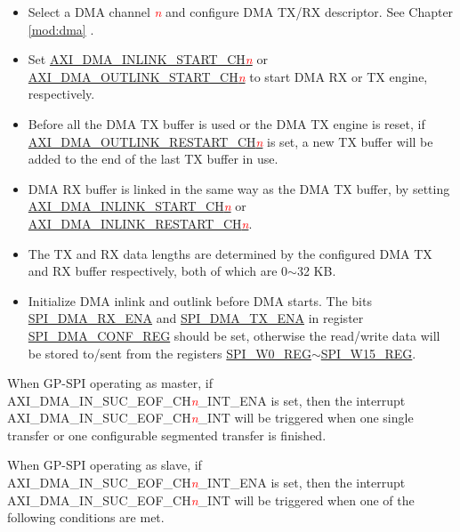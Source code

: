 \documentclass[main\_\_EN.tex]{subfiles}
\begin{document}
\begin{itemize}
    \item Select a DMA channel  \textcolor{red}{\it{n}} and configure DMA TX/RX descriptor. See Chapter \ref{mod:dma} \textit{}.

    \item Set \hyperref[fielddesc:AXIDMAINLINKSTARTCHN]{AXI\_DMA\_INLINK\_START\_CH\textcolor{red}{\it{n}}} or \hyperref[fielddesc:AXIDMAOUTLINKSTARTCHN]{AXI\_DMA\_OUTLINK\_START\_CH\textcolor{red}{\it{n}}} to start DMA RX or TX engine, respectively.

    \item Before all the DMA TX buffer is used or the DMA TX engine is reset, if \hyperref[fielddesc:AXIDMAOUTLINKRESTARTCHN]{AXI\_DMA\_OUTLINK\_RESTART\_CH\textcolor{red}{\it{n}}} is set, a new TX buffer will be added to the end of the last TX buffer in use.

    \item DMA RX buffer is linked in the same way as the DMA TX buffer, by setting \hyperref[fielddesc:AXIDMAINLINKSTARTCHN]{AXI\_DMA\_INLINK\_START\_CH\textcolor{red}{\it{n}}}  or \hyperref[fielddesc:AXIDMAINLINKRESTARTCHN]{AXI\_DMA\_INLINK\_RESTART\_CH\textcolor{red}{\it{n}}}.

    \item The TX and RX data lengths are determined by the configured DMA TX and RX buffer respectively, both of which are 0$\sim$32 KB.

    \item Initialize DMA inlink and outlink before DMA starts. The bits \hyperref[fielddesc:SPIDMARXENA]{SPI\_DMA\_RX\_ENA} and \hyperref[fielddesc:SPIDMATXENA]{SPI\_DMA\_TX\_ENA} in register \hyperref[regdesc:SPIDMACONFREG]{SPI\_DMA\_CONF\_REG} should be set, otherwise the read/write data will be stored to/sent from the registers \hyperref[regdesc:SPIW0REG]{SPI\_W0\_REG}$\sim$\hyperref[regdesc:SPIW15REG]{SPI\_W15\_REG}.

\end{itemize}

When GP-SPI operating as master, if AXI\_DMA\_IN\_SUC\_EOF\_CH\textcolor{red}{\it{n}}\_INT\_ENA  is set, then the interrupt AXI\_DMA\_IN\_SUC\_EOF\_CH\textcolor{red}{\it{n}}\_INT  will be triggered when one single transfer or one configurable segmented transfer is finished.

When GP-SPI operating as slave, if AXI\_DMA\_IN\_SUC\_EOF\_CH\textcolor{red}{\it{n}}\_INT\_ENA is set, then the interrupt AXI\_DMA\_IN\_SUC\_EOF\_CH\textcolor{red}{\it{n}}\_INT will be triggered when one of the following conditions are met.
\end{document}
